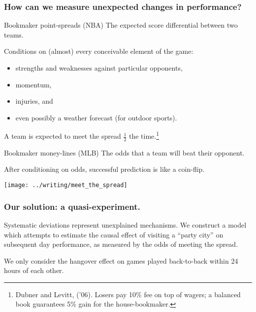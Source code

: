 \documentclass{beamer}
\begin{document}
\begin{frame}
  \frametitle{How can we measure unexpected changes in performance?}     
  \begin{block}{Bookmaker point-spreads (NBA)}     
    The expected score differential between two teams.

    Conditions on (almost) every conceivable element of the game:
    \begin{itemize}     
      \item strengths and weaknesses against particular opponents,
      \item momentum,
      \item injuries, and
      \item even possibly a weather forecast (for outdoor sports).     
    \end{itemize}

    A team is expected to meet the spread $\frac{1}{2}$ the time.\footnote{Dubner and Levitt, ('06). Losers pay 10\% fee on top of wagers; a balanced book guarantees 5\% gain for the house-bookmaker.}
  \end{block}
  \vspace{12pt}
  \begin{block}{Bookmaker money-lines (MLB)}     
    The odds that a team will beat their opponent.

    After conditioning on odds, successful prediction is like a coin-flip. 
  \end{block} 
\end{frame}

\begin{frame}
  \centering   \texttt{[image: ../writing/meet\_the\_spread]} 
\end{frame}


\begin{frame}   \frametitle{Our solution: a quasi-experiment.}
  \begin{block}{Systematic deviations represent unexplained mechanisms.}     We construct a model which attempts to estimate the causal effect of visiting a ``party city''
    on subsequent day performance, as measured by the odds of meeting the spread.       \end{block}

  \begin{block}{}     We only consider the hangover effect on games played back-to-back within 24 hours of each other.   
  \end{block} 
\end{frame}
\end{document}

